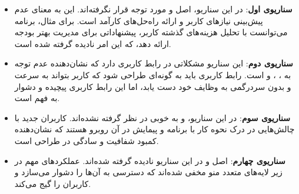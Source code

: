 \begin{itemize}
	\item \textbf{سناریوی اول}: در این سناریو، اصل  و  مورد توجه قرار نگرفته‌اند. این به معنای عدم پیش‌بینی نیازهای کاربر و ارائه راه‌حل‌های کارآمد است. برای مثال، برنامه می‌توانست با تحلیل هزینه‌های گذشته کاربر، پیشنهاداتی برای مدیریت بهتر بودجه ارائه دهد، که این امر نادیده گرفته شده است.
	
	\item \textbf{سناریوی دوم}: این سناریو مشکلاتی در رابط کاربری دارد که نشان‌دهنده عدم توجه به ، ، و  است. رابط کاربری باید به گونه‌ای طراحی شود که کاربر بتواند به سرعت و بدون سردرگمی به وظایف خود دست یابد، اما این رابط کاربری پیچیده و دشوار به فهم است.
	
	\item \textbf{سناریوی سوم}: در این سناریو،  و  به خوبی در نظر گرفته نشده‌اند. کاربران جدید با چالش‌هایی در درک نحوه کار با برنامه و پیمایش در آن روبرو هستند که نشان‌دهنده کمبود شفافیت و سادگی در طراحی است.
	
	\item \textbf{سناریوی چهارم}: اصل  و  در این سناریو نادیده گرفته شده‌اند. عملکردهای مهم در زیر لایه‌های متعدد منو مخفی شده‌اند که دسترسی به آن‌ها را دشوار می‌سازد و کاربران را گیج می‌کند.
\end{itemize}
